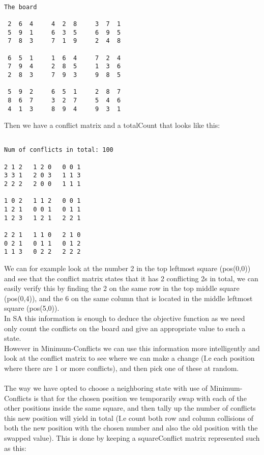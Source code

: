 \documentclass[12pt, a4paper]{article}
\begin{document}
\begin{verbatim}

The board

 2  6  4     4  2  8     3  7  1 
 5  9  1     6  3  5     6  9  5 
 7  8  3     7  1  9     2  4  8 

 6  5  1     1  6  4     7  2  4 
 7  9  4     2  8  5     1  3  6 
 2  8  3     7  9  3     9  8  5 

 5  9  2     6  5  1     2  8  7 
 8  6  7     3  2  7     5  4  6 
 4  1  3     8  9  4     9  3  1 

\end{verbatim}

\noindent
Then we have a conflict matrix and a totalCount that looks like this:

\begin{verbatim}

Num of conflicts in total: 100

2 1 2 	1 2 0 	0 0 1 
3 3 1 	2 0 3 	1 1 3 
2 2 2 	2 0 0 	1 1 1 

1 0 2 	1 1 2 	0 0 1 
1 2 1 	0 0 1 	0 1 1 
1 2 3 	1 2 1 	2 2 1 

2 2 1 	1 1 0 	2 1 0 
0 2 1 	0 1 1 	0 1 2 
1 1 3 	0 2 2 	2 2 2 

\end{verbatim}
\noindent
We can for example look at the number 2 in the top leftmost square (pos(0,0)) and see that the conflict matrix states that it has 2 conflicting 2s in total, we can easily verify this by finding the 2 on the same row in the top middle square (pos(0,4)), and the 6 on the same column that is located in the middle leftmost
square (pos(5,0)).
\\
In SA this information is enough to deduce the objective function as we need only count the conflicts on the board and give an appropriate value to such a state. \\
However in Minimum-Conflicts we can use this information more intelligently and look at the conflict matrix to see where we can make a change (I.e each position where there are 1 or more conflicts), and then pick one of these at random.
\\\\
The way we have opted to choose a neighboring state with use of Minimum-Conflicts is that for the chosen position we temporarily swap with each of the other positions inside the same square, and then tally up the number of conflicts this new position will yield in total (I.e count both row and column collisions of both the new position with the chosen number and also the old position with the swapped value). This is done by keeping a squareConflict matrix represented such as this:
\end{document}
